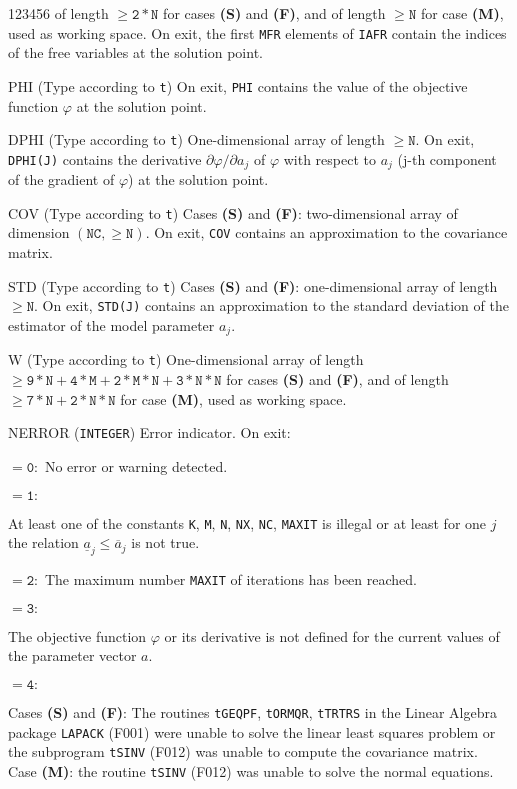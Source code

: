 \begin{DLtt}{123456}
of length $\mathtt{\ge 2*N}$ for cases {\bf (S)} and {\bf (F)}, and of
length $\mathtt{\ge N}$ for case {\bf (M)}, used as working space.
On exit, the first {\tt MFR} elements of {\tt IAFR} contain the
indices of the free variables at the solution point.
\item[PHI]  (Type according to {\tt t}) On exit, {\tt PHI} contains the
value of the objective function $\varphi$ at the solution point.
\item[DPHI] (Type according to {\tt t}) One-dimensional array of length
$\mathtt{\ge N}$.
On exit, {\tt DPHI(J)} contains the derivative
$\partial \varphi / \partial a_j$  of $\varphi$ with
respect to $a_j$ (j-th component of the gradient of $\varphi$)
at the solution point.
\item[COV] (Type according to {\tt t}) Cases {\bf (S)} and {\bf (F)}:
two-dimensional array of dimension $\mathtt{(NC , \ge N)}$. On exit,
{\tt COV} contains an approximation to the covariance matrix.
\item[STD] (Type according to {\tt t}) Cases {\bf (S)} and {\bf (F)}:
one-dimensional array of length $\mathtt{\ge N}$. On exit, {\tt STD(J)}
contains an approximation to the standard deviation of the estimator
of the model parameter $a_j$.
\item[W] (Type according to {\tt t}) One-dimensional array of length
$\mathtt{\ge 9*N+4*M+2*M*N+3*N*N}$ for cases {\bf (S)} and {\bf (F)},
and of length $\mathtt{\ge 7*N+2*N*N}$ for case {\bf (M)}, used as
working space.
\item[NERROR] ({\tt INTEGER}) Error indicator. On exit:
\item[]$\mathtt{ = 0:}$ No error or warning detected.
\item[]$\mathtt{ = 1:}$ \parbox[t]{139mm}{
At least one of the constants {\tt K}, {\tt M}, {\tt N}, {\tt NX},
{\tt NC}, {\tt MAXIT} is illegal or at least for one $j$ the relation
$ \underline{a}_j \leq \overline{a}_j$ is not true.}
\item[]$\mathtt{ = 2:}$
The maximum number {\tt MAXIT} of iterations has been reached.
\item[]$\mathtt{ = 3:}$ \parbox[t]{139mm}{
The objective function $\varphi$ or its derivative is not defined for
the current values of the parameter vector $a$.}
\item[]$\mathtt{ = 4:}$ \parbox[t]{139mm}{
Cases {\bf (S)} and {\bf (F)}:
The routines {\tt tGEQPF}, {\tt tORMQR}, {\tt tTRTRS} in the Linear
Algebra package {\tt LAPACK} (F001) were unable to solve the linear
least squares problem or the subprogram {\tt tSINV} (F012) was unable
to compute the covariance matrix. \\
Case {\bf (M)}: the routine {\tt tSINV} (F012) was unable to solve
the normal equations.}
\end{DLtt}

